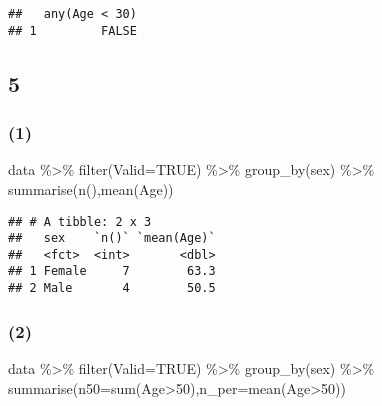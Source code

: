 \documentclass[
]{article}
\newenvironment{Shaded}{\begin{snugshade}}{\end{snugshade}}
\newcommand{\AttributeTok}[1]{\textcolor[rgb]{0.77,0.63,0.00}{#1}}
\newcommand{\ConstantTok}[1]{\textcolor[rgb]{0.00,0.00,0.00}{#1}}
\newcommand{\DecValTok}[1]{\textcolor[rgb]{0.00,0.00,0.81}{#1}}
\newcommand{\FunctionTok}[1]{\textcolor[rgb]{0.00,0.00,0.00}{#1}}
\newcommand{\NormalTok}[1]{#1}
\newcommand{\SpecialCharTok}[1]{\textcolor[rgb]{0.00,0.00,0.00}{#1}}
\begin{document}
\begin{verbatim}
##   any(Age < 30)
## 1         FALSE
\end{verbatim}

\hypertarget{section-11}{%
\subsection{5}\label{section-11}}

\hypertarget{section-12}{%
\subsubsection{(1)}\label{section-12}}

\begin{Shaded}
\begin{Highlighting}[]
\NormalTok{data  }\SpecialCharTok{\%\textgreater{}\%} \FunctionTok{filter}\NormalTok{(}\AttributeTok{Valid=}\ConstantTok{TRUE}\NormalTok{) }\SpecialCharTok{\%\textgreater{}\%} \FunctionTok{group\_by}\NormalTok{(sex) }\SpecialCharTok{\%\textgreater{}\%} \FunctionTok{summarise}\NormalTok{(}\FunctionTok{n}\NormalTok{(),}\FunctionTok{mean}\NormalTok{(Age))}
\end{Highlighting}
\end{Shaded}

\begin{verbatim}
## # A tibble: 2 x 3
##   sex    `n()` `mean(Age)`
##   <fct>  <int>       <dbl>
## 1 Female     7        63.3
## 2 Male       4        50.5
\end{verbatim}

\hypertarget{section-13}{%
\subsubsection{(2)}\label{section-13}}

\begin{Shaded}
\begin{Highlighting}[]
\NormalTok{data  }\SpecialCharTok{\%\textgreater{}\%} \FunctionTok{filter}\NormalTok{(}\AttributeTok{Valid=}\ConstantTok{TRUE}\NormalTok{) }\SpecialCharTok{\%\textgreater{}\%} \FunctionTok{group\_by}\NormalTok{(sex) }\SpecialCharTok{\%\textgreater{}\%} \FunctionTok{summarise}\NormalTok{(}\AttributeTok{n50=}\FunctionTok{sum}\NormalTok{(Age}\SpecialCharTok{\textgreater{}}\DecValTok{50}\NormalTok{),}\AttributeTok{n\_per=}\FunctionTok{mean}\NormalTok{(Age}\SpecialCharTok{\textgreater{}}\DecValTok{50}\NormalTok{)) }
\end{Highlighting}
\end{Shaded}
\end{document}
